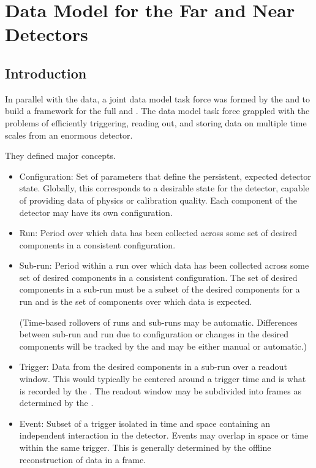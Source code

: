\section{Data Model for the Far and Near Detectors}
\label{ch:exec-comp-mod}

\subsection{Introduction}
\label{ch:exec-comp-mod-int}
In parallel with the  data, a joint data model task force was formed by the  and  to build a framework for the full   and . 
The data model task force grappled with the problems of efficiently triggering, reading out, and storing data on multiple time scales from an enormous detector.

They defined major concepts.

\begin{itemize}

\item{Configuration:} Set of parameters that define the persistent, expected detector state. Globally, this corresponds to a desirable state for the detector, capable of providing data of physics or calibration quality. Each component of the detector may have its own configuration.
 
\item{Run:} Period over which data has been collected across some set of desired components in a consistent configuration.
 
\item{Sub-run:} Period within a run over which data has been collected across some set of desired components in a consistent configuration. The set of desired components in a sub-run must be a subset of the desired components for a run and is the set of components over which data is expected.
 
(Time-based rollovers of runs and sub-runs may be automatic. Differences between sub-run and run due to configuration or changes in the desired components will be tracked by the  and may be either manual or automatic.)
 
\item{Trigger:} Data from the desired components in a sub-run over a readout window. This would typically be centered around a trigger time and is what is recorded by the . The readout window may be subdivided into frames as determined by the .
 
\item{Event:} Subset of a trigger isolated in time and space containing an independent interaction in the detector. Events may overlap in space or time within the same trigger. This is generally determined by the offline reconstruction of data in a frame.

\end{itemize}

